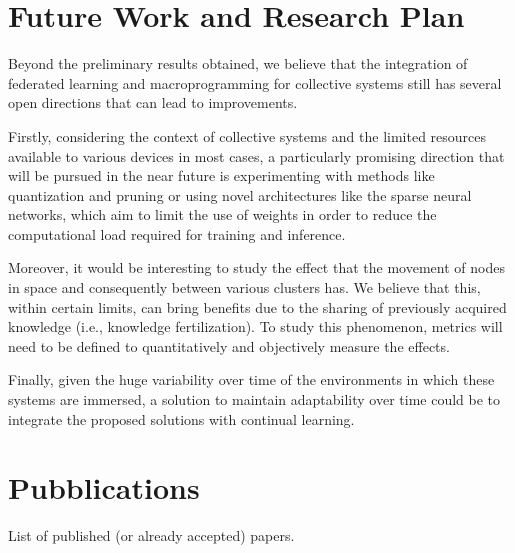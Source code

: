 \documentclass[runningheads]{llncs}
\begin{document}
\section{Future Work and Research Plan}\label{sec:future}

Beyond the preliminary results obtained, we believe that the integration of federated learning and macroprogramming for collective systems still has several
 open directions that can lead to improvements. 

Firstly, considering the context of collective systems and the limited resources available to various devices in most cases, 
 a particularly promising direction that will be pursued in the near future is 
 experimenting with methods like quantization and pruning or using novel architectures like the sparse neural networks, 
 which aim to limit the use of weights in order to reduce the computational load required for training and inference.

Moreover, it would be interesting to study the effect that the movement of nodes in space and consequently between various clusters has. 
%
We believe that this, within certain limits, can bring benefits due to the sharing of previously acquired knowledge (i.e., knowledge fertilization). 
%
To study this phenomenon, metrics will need to be defined to quantitatively and objectively measure the effects.

Finally, given the huge variability over time of the environments in which these systems are immersed, a solution to maintain adaptability over time could 
 be to integrate the proposed solutions with continual learning.

\section{Pubblications}
List of published (or already accepted) papers.
\end{document}
